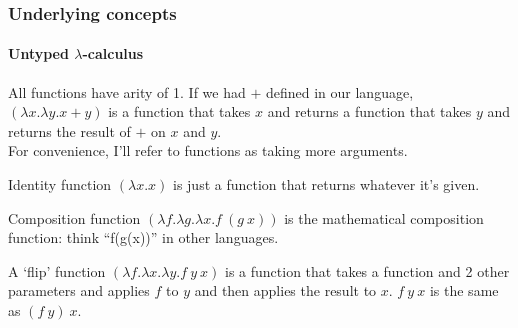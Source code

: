 \documentclass{beamer}
\begin{document}
\begin{frame}
  \frametitle{Underlying concepts}
  \framesubtitle{Untyped $\lambda$-calculus}
  All functions have arity of 1. If we had $+$ defined in our language,
  $(\lambda x.\lambda y. x + y)$ is a function that takes $x$ and
  returns a function that takes $y$ and returns the result of $+$ on
  $x$ and $y$.\\
  \pause
  For convenience, I'll refer to functions as taking more arguments.
  \pause
  \begin{exampleblock}{Identity function}
    $(\lambda x.x)$ is just a function that returns whatever it's
    given.
  \end{exampleblock}
  \pause
  \begin{exampleblock}{Composition function}
    $(\lambda f.\lambda g.\lambda x.f\:(g\:x))$ is the mathematical
    composition function: think ``f(g(x))'' in other languages.
  \end{exampleblock}
  \pause
  \begin{exampleblock}{A `flip' function}
    $(\lambda f.\lambda x.\lambda y.f\:y\:x)$ is a function
    that takes a function and 2 other parameters and applies $f$ to
    $y$ and then applies the result to $x$. $f\:y\:x$ is the same as $(f\:y)\:x$.
  \end{exampleblock}
\end{frame}
\end{document}
